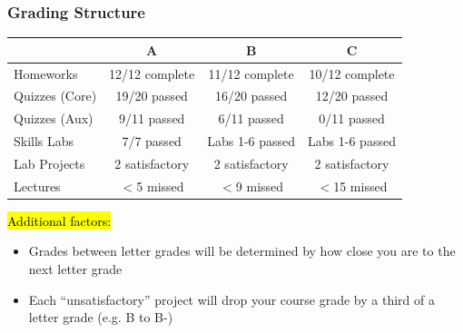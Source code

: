 \documentclass[slidestop,compress,mathserif]{beamer}
\begin{document}
\begin{frame}
	\frametitle{Grading Structure}
	\begin{table}[ht]
	\centering
	\small
	\begin{tabular}{|l|c|c|c|}
	\hline
	 & \textbf{A} & \textbf{B} & \textbf{C} \\
	\hline
	Homeworks & 12/12 complete & 11/12 complete & 10/12 complete \\
	\hline
	Quizzes (Core) & 19/20 passed & 16/20 passed & 12/20 passed \\
	\hline
	Quizzes (Aux) & 9/11 passed & 6/11 passed & 0/11 passed \\
	\hline
	Skills Labs & 7/7 passed & Labs 1-6 passed & Labs 1-6 passed \\
	\hline
	Lab Projects & 2 satisfactory & 2 satisfactory & 2 satisfactory \\
	\hline
	Lectures & $<$5 missed & $<$9 missed & $<$15 missed \\
	\hline
	\end{tabular}
	\end{table}

	\hl{Additional factors:}
	\begin{itemize}
		\item Grades between letter grades will be determined by how close you are to the next letter grade
		\item Each ``unsatisfactory'' project will drop your course grade by a third of a letter grade (e.g. B to B-)
	\end{itemize}
\end{frame}

\end{document}
